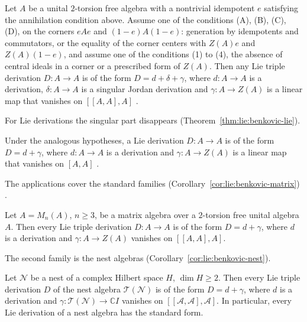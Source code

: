 \begin{theorem}\label{thm:lie:benkovic-triple}
Let $A$ be a unital $2$-torsion free algebra with a nontrivial idempotent $e$
satisfying the annihilation condition above. Assume one of the conditions
\textup{(A)}, \textup{(B)}, \textup{(C)}, \textup{(D)}, on the corners $eAe$
and $(1-e)A(1-e)$: generation by idempotents and commutators, or the equality
of the corner centers with $Z(A)e$ and $Z(A)(1-e)$, and assume one of the
conditions \textup{(1)} to \textup{(4)}, the absence of central ideals in a
corner or a prescribed form of $Z(A)$. Then any Lie triple derivation
$D\colon A\to A$ is of the form $D=d+\delta+\gamma$, where $d\colon A\to A$
is a derivation, $\delta\colon A\to A$ is a singular Jordan derivation and
$\gamma\colon A\to Z(A)$ is a linear map that vanishes on $[[A,A],A]$
\cite[p.~159]{Benkovic2015}.
\end{theorem}

For Lie derivations the singular part disappears
(Theorem~\ref{thm:lie:benkovic-lie}).

\begin{theorem}\label{thm:lie:benkovic-lie}
Under the analogous hypotheses, a Lie derivation $D\colon A\to A$ is of the
form $D=d+\gamma$, where $d\colon A\to A$ is a derivation and
$\gamma\colon A\to Z(A)$ is a linear map that vanishes on $[A,A]$
\cite[p.~160]{Benkovic2015}.
\end{theorem}

The applications cover the standard families
(Corollary~\ref{cor:lie:benkovic-matrix}) \cite[pp.~161--163]{Benkovic2015}.

\begin{corollary}\label{cor:lie:benkovic-matrix}
Let $A=M_{n}(A)$, $n\ge3$, be a matrix algebra over a $2$-torsion free unital
algebra $A$. Then every Lie triple derivation $D\colon A\to A$ is of the form
$D=d+\gamma$, where $d$ is a derivation and $\gamma\colon A\to Z(A)$ vanishes
on $[[A,A],A]$.
\end{corollary}

The second family is the nest algebras
(Corollary~\ref{cor:lie:benkovic-nest}).

\begin{corollary}\label{cor:lie:benkovic-nest}
Let $\mathcal{N}$ be a nest of a complex Hilbert space $H$, $\dim H\ge2$. Then
every Lie triple derivation $D$ of the nest algebra $\mathcal{T}(\mathcal{N})$
is of the form $D=d+\gamma$, where $d$ is a derivation and
$\gamma\colon\mathcal{T}(\mathcal{N})\to\mathbb{C}I$ vanishes on
$[[\mathcal{A},\mathcal{A}],\mathcal{A}]$. In particular, every Lie derivation
of a nest algebra has the standard form.
\end{corollary}

